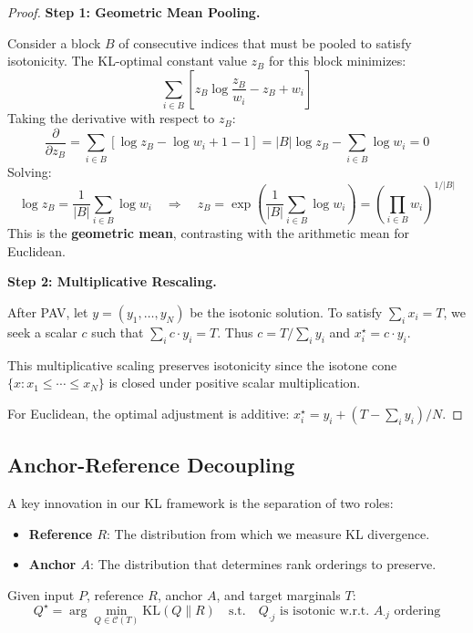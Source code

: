 \begin{proof}
\textbf{Step 1: Geometric Mean Pooling.}

Consider a block $B$ of consecutive indices that must be pooled to satisfy isotonicity.
The KL-optimal constant value $z_B$ for this block minimizes:
\[
\sum_{i \in B} \left[z_B \log\frac{z_B}{w_i} - z_B + w_i\right]
\]
Taking the derivative with respect to $z_B$:
\[
\frac{\partial}{\partial z_B} = \sum_{i \in B} \left[\log z_B - \log w_i + 1 - 1\right] = |B| \log z_B - \sum_{i \in B} \log w_i = 0
\]
Solving:
\[
\log z_B = \frac{1}{|B|} \sum_{i \in B} \log w_i \quad\Rightarrow\quad z_B = \exp\left(\frac{1}{|B|} \sum_{i \in B} \log w_i\right) = \left(\prod_{i \in B} w_i\right)^{1/|B|}
\]
This is the \textbf{geometric mean}, contrasting with the arithmetic mean for Euclidean.

\medskip
\textbf{Step 2: Multiplicative Rescaling.}

After PAV, let $y = (y_1, \ldots, y_N)$ be the isotonic solution. To satisfy
$\sum_i x_i = T$, we seek a scalar $c$ such that $\sum_i c \cdot y_i = T$.
Thus $c = T / \sum_i y_i$ and $x^\star_i = c \cdot y_i$.

This multiplicative scaling preserves isotonicity since the isotone cone
$\{x : x_1 \leq \cdots \leq x_N\}$ is closed under positive scalar multiplication.

For Euclidean, the optimal adjustment is additive: $x^\star_i = y_i + (T - \sum_i y_i)/N$.
\end{proof}


\subsection{Anchor-Reference Decoupling}

A key innovation in our KL framework is the separation of two roles:
\begin{itemize}
\item \textbf{Reference $R$}: The distribution from which we measure KL divergence.
\item \textbf{Anchor $A$}: The distribution that determines rank orderings to preserve.
\end{itemize}

\begin{definition}
Given input $P$, reference $R$, anchor $A$, and target marginals $T$:
\begin{equation}
Q^\star = \arg\min_{Q \in \mathcal{C}(T)} \text{KL}(Q \| R) \quad\text{s.t.}\quad Q_{\cdot j} \text{ is isotonic w.r.t. } A_{\cdot j} \text{ ordering}
\end{equation}
\end{definition}


